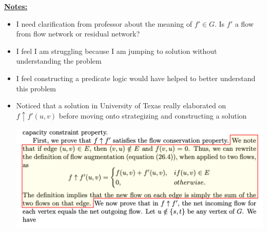 \documentclass[12pt]{article}
\begin{document}
\begin{enumerate}[1.]









    \bigskip

    \underline{\textbf{Notes:}}

    \bigskip

    \begin{itemize}
        \item I need clarification from professor about the meaning of $f' \in G$.
        Is $f'$ a flow from flow network or residual network?
        \item I feel I am struggling because I am jumping to solution without understanding the problem
        \item I feel constructing a predicate logic would have helped to better understand this problem
        \item Noticed that a solution in University of Texas really elaborated on $f \uparrow f'(u,v)$
        before moving onto strategizing and constructing a solution

        \begin{center}
        \includegraphics[width=0.8\linewidth]{images/worksheet_5_solution_18.png}
        \end{center}


\end{itemize}
\end{enumerate}
\end{document}
